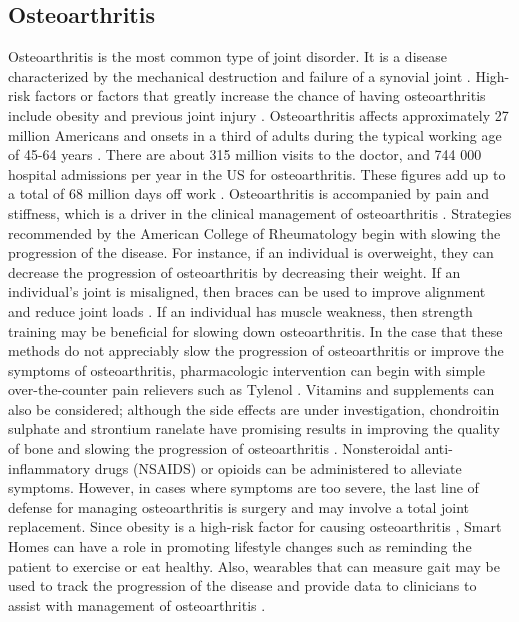 \subsection{Osteoarthritis}
Osteoarthritis is the most common type of joint disorder. It is a disease characterized by the mechanical destruction and failure of a synovial joint \cite{hunter_osteoarthritis_2019}. High-risk factors or factors that greatly increase the chance of having osteoarthritis include obesity and previous joint injury \cite{prieto-lhambra_osteoarthritis_2014}. Osteoarthritis affects approximately 27 million Americans \cite{lespasio_hip_2018} and onsets in a third of adults during the typical working age of 45-64 years \cite{hootman_projections_2006}. There are about 315 million visits to the doctor, and 744 000 hospital admissions per year in the US for osteoarthritis. These figures add up to a total of 68 million days off work \cite{prieto-lhambra_osteoarthritis_2014}.
Osteoarthritis is accompanied by pain and stiffness, which is a driver in the clinical management of osteoarthritis \cite{hunter_osteoarthritis_2019}. Strategies recommended by the American College of Rheumatology begin with slowing the progression of the disease. For instance, if an individual is overweight, they can decrease the progression of osteoarthritis by decreasing their weight. If an individual’s joint is misaligned, then braces can be used to improve alignment and reduce joint loads \cite{prieto-lhambra_osteoarthritis_2014}. If an individual has muscle weakness, then strength training may be beneficial for slowing down osteoarthritis. 
In the case that these methods do not appreciably slow the progression of osteoarthritis or improve the symptoms of osteoarthritis, pharmacologic intervention can begin with simple over-the-counter pain relievers such as Tylenol \cite{prieto-lhambra_osteoarthritis_2014}. Vitamins and supplements can also be considered; although the side effects are under investigation, chondroitin sulphate and strontium ranelate have promising results in improving the quality of bone and slowing the progression of osteoarthritis \cite{prieto-lhambra_osteoarthritis_2014}. Nonsteroidal anti-inflammatory drugs (NSAIDS) or opioids can be administered to alleviate symptoms. However, in cases where symptoms are too severe, the last line of defense for managing osteoarthritis is surgery and may involve a total joint replacement.
Since obesity is a high-risk factor for causing osteoarthritis \cite{hunter_osteoarthritis_2019}, Smart Homes can have a role in promoting lifestyle changes such as reminding the patient to exercise or eat healthy. Also, wearables that can measure gait may be used to track the progression of the disease and provide data to clinicians to assist with management of osteoarthritis \cite{choi_mhealth_2019}.


